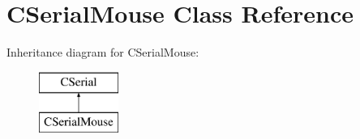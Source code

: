 \hypertarget{classCSerialMouse}{\section{C\-Serial\-Mouse Class Reference}
\label{classCSerialMouse}
}
Inheritance diagram for C\-Serial\-Mouse\-:\begin{figure}[H]
\begin{center}
\leavevmode
\includegraphics[height=2.000000cm]{classCSerialMouse}
\end{center}
\end{figure}
